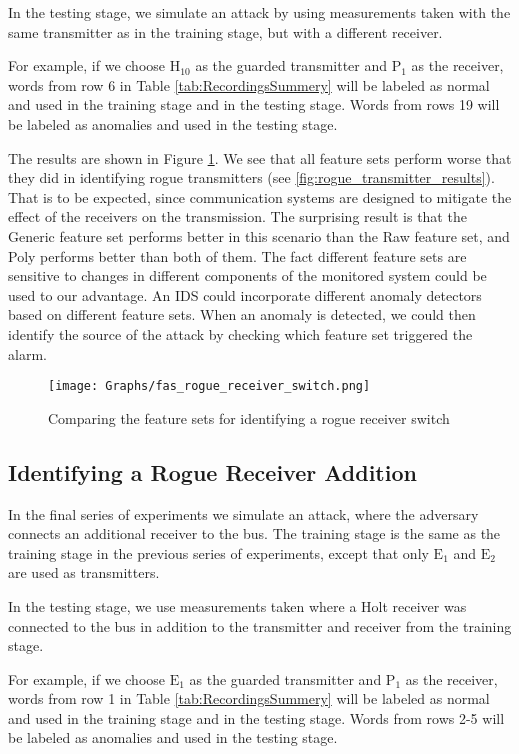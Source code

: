 \documentclass[conference]{IEEEtran}
\begin{document}
  In the testing stage, we simulate an attack by using measurements taken with the same transmitter as in the training stage, but with a different receiver.
  
  For example, if we choose \(\text{H}_{10}\) as the guarded transmitter and \(\text{P}_1\) as the receiver, words from row 6 in Table \ref{tab:RecordingsSummery} will be labeled as normal and used in the training stage and in the testing stage. Words from rows 19 will be labeled as anomalies and used in the testing stage.
  
  The results are shown in Figure \ref{fig:receiver_results}. We see that all feature sets perform worse that they did in identifying rogue transmitters (see \ref{fig:rogue_transmitter_results}). That is to be expected, since communication systems are designed to mitigate the effect of the receivers on the transmission. The surprising result is that the Generic feature set performs better in this scenario than the Raw feature set, and Poly performs better than both of them. The fact different feature sets are sensitive to changes in different components of the monitored system could be used to our advantage. An IDS could incorporate different anomaly detectors based on different feature sets. When an anomaly is detected, we could then identify the source of the attack by checking which feature set triggered the alarm.
  
  \begin{figure}[t]
    \centering
    \texttt{[image: Graphs/fas\_rogue\_receiver\_switch.png]}
    \caption{Comparing the feature sets for identifying a rogue receiver switch}
    \label{fig:receiver_results}
  \end{figure}
  
\subsection{Identifying a Rogue Receiver Addition}
  In the final series of experiments we simulate an attack, where the adversary connects an additional receiver to the bus. The training stage is the same as the training stage in the previous series of experiments, except that only \(\text{E}_1\) and \(\text{E}_2\) are used as transmitters.
  
  In the testing stage, we use measurements taken where a Holt receiver was connected to the bus in addition to the transmitter and receiver from the training stage.
  
  For example, if we choose \(\text{E}_1\) as the guarded transmitter and \(\text{P}_1\) as the receiver, words from row 1 in Table \ref{tab:RecordingsSummery} will be labeled as normal and used in the training stage and in the testing stage. Words from rows 2-5 will be labeled as anomalies and used in the testing stage.
  
\end{document}
